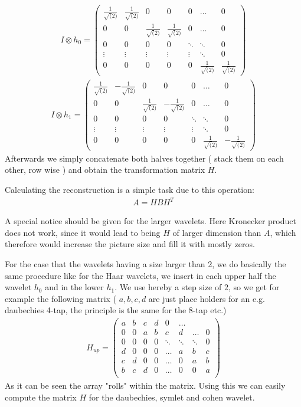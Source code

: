 \begin{gather}
I \otimes h_0 = \left( \begin{array}{ccccccc}
\frac{1}{\sqrt(2)} & \frac{1}{\sqrt(2)} & 0 & 0 & 0 & \ldots & 0 \\
0 & 0 & \frac{1}{\sqrt(2)} & \frac{1}{\sqrt(2)} & 0 & \ldots & 0 \\
0 & 0 & 0 & 0 & \ddots & \ddots & 0 \\
\vdots & \vdots & \vdots & \vdots & \vdots & \ddots & 0\\
0 & 0 & 0 & 0 & 0 & \frac{1}{\sqrt(2)} & \frac{1}{\sqrt(2)}
\end{array} \right)
\end{gather}
\begin{gather}
I \otimes h_1 = \left( \begin{array}{ccccccc}
\frac{1}{\sqrt(2)} & -\frac{1}{\sqrt(2)} & 0 & 0 & 0 & \ldots & 0 \\
0 & 0 & \frac{1}{\sqrt(2)} & -\frac{1}{\sqrt(2)} & 0 & \ldots & 0 \\
0 & 0 & 0 & 0 & \ddots & \ddots & 0 \\
\vdots & \vdots & \vdots & \vdots & \vdots & \ddots & 0\\
0 & 0 & 0 & 0 & 0 & \frac{1}{\sqrt(2)} & -\frac{1}{\sqrt(2)}
\end{array} \right)
\end{gather}
Afterwards we simply concatenate both halves together ( stack them on each other, row wise ) and obtain the transformation matrix $H$.

Calculating the reconstruction is a simple task due to this operation:
\begin{gather*}
A = H B H^T
\end{gather*}

A special notice should be given for the larger wavelets. Here Kronecker product does not work, since it would lead to being $H$ of larger dimension than $A$, which therefore would increase the picture size and fill it with mostly zeros.

For the case that the wavelets having a size larger than 2, we do basically the same procedure like for the Haar wavelets, we insert in each upper half the wavelet $h_0$ and in the lower $h_1$. We use hereby a step size of $2$, so we get for example the following matrix ( $a,b,c,d$ are just place holders for an e.g. daubechies 4-tap, the principle is the same for the 8-tap etc.)
\begin{gather*}
H_{up} = \left( \begin{array}{cccccccc}
a & b & c & d & 0 & \hdots  \\
0 & 0 & a & b & c & d & \hdots & 0\\
0 & 0 & 0 & 0 & \ddots & \ddots & \ddots & 0\\
d & 0 & 0 & 0 & \ldots & a & b & c \\
c & d & 0 & 0 & \ldots & 0 & a & b \\
b & c & d & 0 & \ldots & 0 & 0 & a \\
\end{array}
\right) 
\end{gather*}
As it can be seen the array "rolls" within the matrix. Using this we can easily compute the matrix $H$ for the daubechies, symlet and cohen wavelet.

